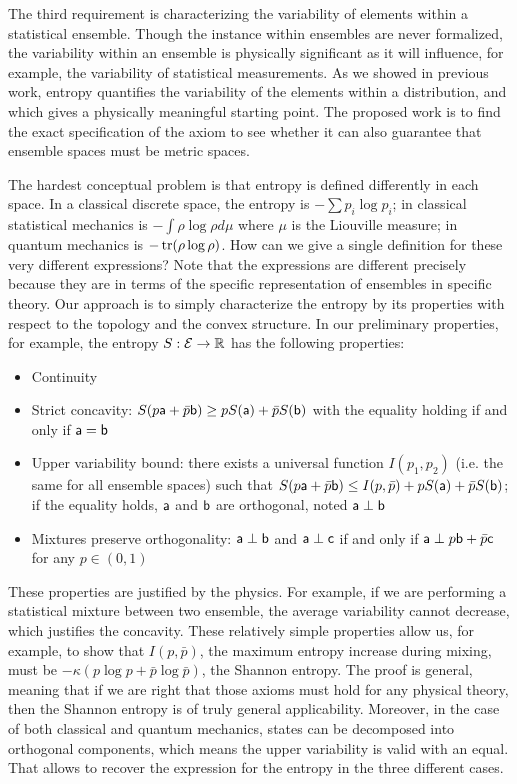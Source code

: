 The third requirement is characterizing the variability of elements within a statistical ensemble. Though the instance within ensembles are never formalized, the variability within an ensemble is physically significant as it will influence, for example, the variability of statistical measurements. As we showed in previous work, entropy quantifies the variability of the elements within a distribution, and which gives a physically meaningful starting point. The proposed work is to find the exact specification of the axiom to see whether it can also guarantee that ensemble spaces must be metric spaces.

The hardest conceptual problem is that entropy is defined differently in each space. In a classical discrete space, the entropy is $-\sum p_i \log p_i$; in classical statistical mechanics is $- \int \rho \log \rho d\mu$ where $\mu$ is the Liouville measure; in quantum mechanics is $-\tr(\rho \log \rho)$. How can we give a single definition for these very different expressions? Note that the expressions are different precisely because they are in terms of the specific representation of ensembles in specific theory. Our approach is to simply characterize the entropy by its properties with respect to the topology and the convex structure. In our preliminary properties, for example, the entropy $S : \Ens \to \mathbb{R}$ has the following properties:
\begin{itemize}
	\item Continuity
	\item Strict concavity: $S(p\ens[a] + \bar{p} \ens[b]) \geq p S(\ens[a]) + \bar{p} S(\ens[b])$ with the equality holding if and only if $\ens[a] = \ens[b]$
	\item Upper variability bound: there exists a universal function $I(p_1, p_2)$ (i.e. the same for all ensemble spaces) such that $S(p\ens[a] + \bar{p} \ens[b]) \leq I(p, \bar{p}) + p S(\ens[a]) + \bar{p} S(\ens[b])$; if the equality holds, $\ens[a]$ and $\ens[b]$ are orthogonal, noted $\ens[a] \ortho \ens[b]$
	\item Mixtures preserve orthogonality: $\ens[a] \ortho \ens[b]$ and $\ens[a] \ortho \ens[c]$ if and only if $\ens[a] \ortho p \ens[b] + \bar{p} \ens[c]$ for any $p \in (0,1)$
\end{itemize}
These properties are justified by the physics. For example, if we are performing a statistical mixture between two ensemble, the average variability cannot decrease, which justifies the concavity. These relatively simple properties allow us, for example, to show that $I(p,\bar{p})$, the maximum entropy increase during mixing, must be $ - \kappa \left(p \log p + \bar{p} \log \bar{p}\right)$, the Shannon entropy. The proof is general, meaning that if we are right that those axioms must hold for any physical theory, then the Shannon entropy is of truly general applicability. Moreover, in the case of both classical and quantum mechanics, states can be decomposed into orthogonal components, which means the upper variability is valid with an equal. That allows to recover the expression for the entropy in the three different cases.

